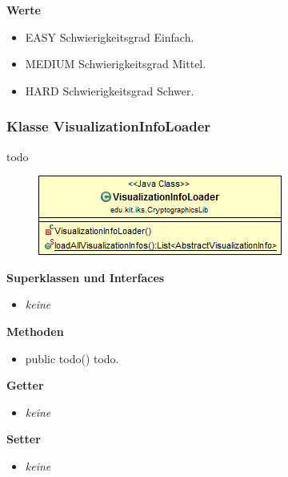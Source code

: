 \documentclass{article}
\begin{document}
      \textbf{Werte}
      \begin{itemize}
        \item EASY \newline
          Schwierigkeitsgrad \glqq Einfach\grqq.
        \item MEDIUM \newline
          Schwierigkeitsgrad \glqq Mittel\grqq.
        \item HARD \newline
          Schwierigkeitsgrad \glqq Schwer\grqq.
      \end{itemize}
	
	\subsubsection{Klasse VisualizationInfoLoader}
	  todo
	
      \begin{figure}[H]
        \centering
        \includegraphics{resources/edu-kit-iks-CryptographicsLib-VisualizationInfoLoader}
      \end{figure}
	
      \textbf{Superklassen und Interfaces}
      \begin{itemize}
        \item \textit{keine}
      \end{itemize}
	
      \textbf{Methoden}
      \begin{itemize}
        \item public todo() \newline
          todo.
      \end{itemize}
      
      \textbf{Getter}
      \begin{itemize}
		\item \textit{keine}
      \end{itemize}
      
      \textbf{Setter}
      \begin{itemize}
        \item \textit{keine}
      \end{itemize}
	
\end{document}
